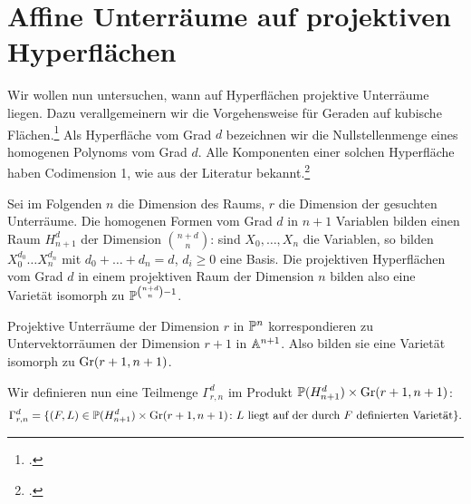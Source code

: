\section{Affine Unterräume auf projektiven Hyperflächen} \label{sec:linesproj}
Wir wollen nun untersuchen, wann auf Hyperflächen projektive Unterräume liegen. Dazu verallgemeinern wir die Vorgehensweise für Geraden auf kubische Flächen.\footcite[siehe][S.~78ff]{Shafarevich} Als Hyperfläche vom Grad $d$ bezeichnen wir die Nullstellenmenge eines homogenen Polynoms vom Grad $d$. Alle Komponenten einer solchen Hyperfläche haben Codimension 1, wie aus der Literatur bekannt.\footcite[siehe][S.~74, Theorem~4]{Shafarevich}

Sei im Folgenden $n$ die Dimension des Raums, $r$ die Dimension der gesuchten Unterräume. Die homogenen Formen vom Grad $d$ in $n+1$ Variablen bilden einen Raum $H_{n+1}^d$ der Dimension $\binom{n+d}{n}$: sind $X_0, \dots, X_n$ die Variablen, so bilden $X_0^{d_0} \dots X_n^{d_n}$ mit $d_0 + \dots + d_n = d$, $d_i \geq 0$ eine Basis. Die projektiven Hyperflächen vom Grad $d$ in einem projektiven Raum der Dimension $n$ bilden also eine Varietät isomorph zu $\mathbb P^{\binom{n+d}{n} - 1}$.

Projektive Unterräume der Dimension $r$ in $\mathbb P^{n}$ korrespondieren zu Untervektorräumen der Dimension $r+1$ in $\mathbb A^{n+1}$. Also bilden sie eine Varietät isomorph zu $\grass r+1/{n+1}$.

Wir definieren nun eine Teilmenge $\Gamma_{r,n}^d$ im Produkt $\mathbb P(H_{n+1}^d) \times \grass r+1/{n+1}$:
\begin{equation}
\Gamma_{r,n}^d = \{(F,L) \in \mathbb P(H_{n+1}^d) \times \grass r+1/{n+1} \colon \text{$L$ liegt auf der durch $F$ definierten Varietät} \}.
\end{equation}

